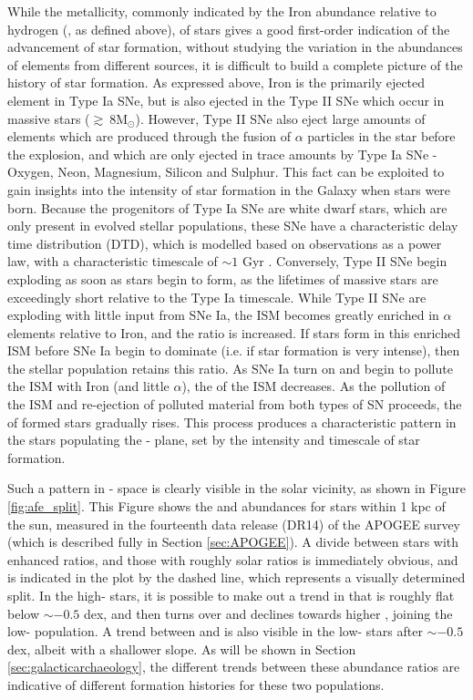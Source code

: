 While the metallicity, commonly indicated by the Iron abundance relative to hydrogen (\feh{}, as defined above), of stars gives a good first-order indication of the advancement of star formation, without studying the variation in the abundances of elements from different sources, it is difficult to build a complete picture of the history of star formation. As expressed above, Iron is the primarily ejected element in Type Ia SNe, but is also ejected in the Type II SNe which occur in massive stars ($\gtrsim \ 8 \mathrm{M_{\odot}}$). However, Type II SNe also eject large amounts of elements which are produced through the fusion of $\alpha$ particles in the star before the explosion, and which are only ejected in trace amounts by Type Ia SNe - Oxygen, Neon, Magnesium, Silicon and Sulphur. This fact can be exploited to gain insights into the intensity of star formation in the Galaxy when stars were born. Because the progenitors of Type Ia SNe are white dwarf stars, which are only present in evolved stellar populations, these SNe have a characteristic delay time distribution (DTD), which is modelled based on observations as a power law, with a characteristic timescale of $\sim 1$ Gyr \citep[e.g.][]{2012MNRAS.426.3282M,2014ApJ...783...28G}. Conversely, Type II SNe begin exploding as soon as stars begin to form, as the lifetimes of massive stars are exceedingly short relative to the Type Ia timescale. While Type II SNe are exploding with little input from SNe Ia, the ISM becomes greatly enriched in $\alpha$ elements relative to Iron, and the \afe{} ratio is increased. If stars form in this enriched ISM before SNe Ia begin to dominate (i.e. if star formation is very intense), then the stellar population retains this \afe{} ratio. As SNe Ia turn on and begin to pollute the ISM with Iron (and little $\alpha$), the \afe{} of the ISM decreases. As the pollution of the ISM and re-ejection of polluted material from both types of SN proceeds, the \feh{} of formed stars gradually rises. This process produces a characteristic pattern in the stars populating the \afe{}-\feh{} plane, set by the intensity and timescale of star formation.

Such a pattern in \afe{}-\feh{} space is clearly visible in the solar vicinity, as shown in Figure \ref{fig:afe_split}. This Figure shows the \afe{} and \feh{} abundances for stars within 1 kpc of the sun, measured in the fourteenth data release (DR14) of the APOGEE survey (which is described fully in Section \ref{sec:APOGEE}). A divide between stars with enhanced \afe{} ratios, and those with roughly solar ratios is immediately obvious, and is indicated in the plot by the dashed line, which represents a visually determined split. In the high-\afe{} stars, it is possible to make out a trend in \afe{} that is roughly flat below \feh{}$\sim -0.5$ dex, and then turns over and declines towards higher \feh{}, joining the low-\afe{} population. A trend between \afe{} and \feh{} is also visible in the low-\afe{} stars after \feh{}$\sim -0.5$ dex, albeit with a shallower slope. As will be shown in Section \ref{sec:galacticarchaeology}, the different trends between these abundance ratios are indicative of different formation histories for these two populations.

